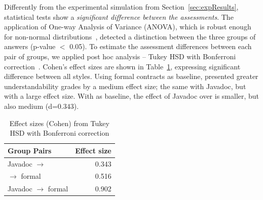 \begin{figure}
\centering
\end{figure}


Differently from the experimental simulation from Section~\ref{sec:expResults}, statistical tests show a \emph{significant difference between the assessments}. The application of One-way Analysis of Variance (ANOVA), which is robust enough for non-normal distributions~\cite{statistical}, detected a distinction between the three groups of answers (p-value $<$ 0.05). 
To estimate the assessment differences between each pair of groups, we applied post hoc analysis -- Tukey HSD with Bonferroni correction~\cite{statistical}. Cohen's effect sizes are shown in Table~\ref{tab:effect}, expressing significant difference between all styles. Using formal contracts as baseline, \contractjdoc{} presented greater understandability grades by a medium effect size; the same with Javadoc, but with a large effect size. With \contractjdoc{} as baseline, the effect of Javadoc over \contractjdoc{} is smaller, but also medium (d=$0.343$).

\begin{table}
\centering
\caption{Effect sizes (Cohen) from Tukey HSD with Bonferroni correction}
\label{tab:effect}
\begin{tabular}{l|r} 
\toprule
\textbf{Group Pairs}                                                & \textbf{Effect size}  \\ 
\toprule
Javadoc $\rightarrow$ \contractjdoc{} & 0.343                 \\
\contractjdoc{} $\rightarrow$ formal  & 0.516                 \\
Javadoc $\rightarrow$ formal          & 0.902                \\
\hline
\end{tabular}
\end{table}




% 
% 
% 
% 
% 
% 


